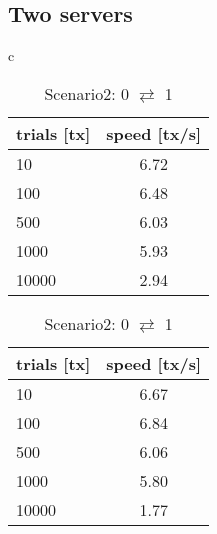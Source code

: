 \documentclass[a4j,11pt,uplatex,onecolumn]{article}
\begin{document}
\subsection{Two servers}
\begin{table}[htb]
    \begin{center}
        \begin{tabular}{c}

            \begin{minipage}{0.5\hsize}
                \begin{center}
                    \caption{Scenario1: 0 $\rightarrow$ 1}
                    \begin{tabular}{|l|c|} \hline
                        trials [tx] & speed [tx/s]\\ \hline \hline
                        10 & 6.72\\
                        100 & 6.48\\
                        500 & 6.03\\
                        1000 & 5.93\\
                        10000 & 2.94\\ \hline
                    \end{tabular}
                \end{center}
            \end{minipage}

            \begin{minipage}{0.5\hsize}
                \begin{center}
                    \caption{Scenario2: 0 $\rightleftarrows$ 1}
                    \begin{tabular}{|l|c|} \hline
                        trials [tx] & speed [tx/s]\\ \hline \hline
                        10 & 6.67\\
                        100 & 6.84\\
                        500 & 6.06\\
                        1000 & 5.80\\
                        10000 & 1.77\\ \hline
                    \end{tabular}
                \end{center}
            \end{minipage}

        \end{tabular}
    \end{center}
\end{table}
\end{document}
